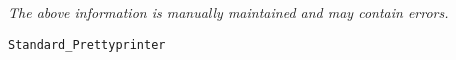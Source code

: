 \label{pkg:standard\_prettyprinter}

{\tiny \it The above information is manually maintained and may contain errors.}
\begin{verbatim}
Standard_Prettyprinter
\end{verbatim}
